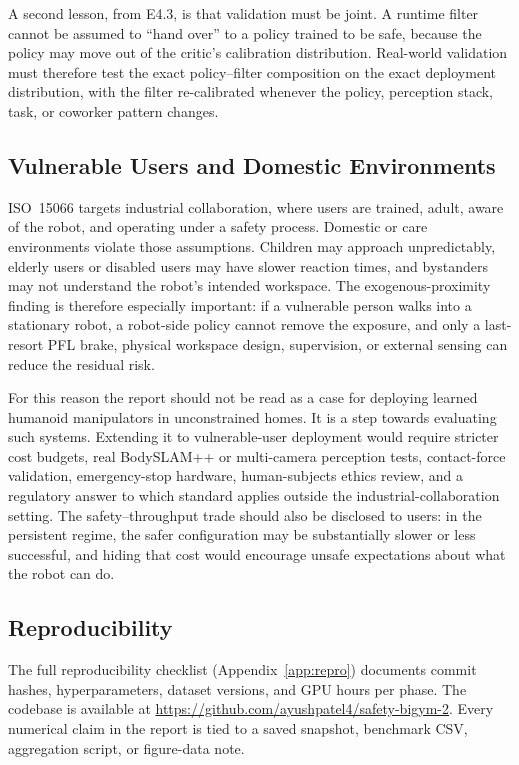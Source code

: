 \documentclass[11pt,a4paper]{report}
\newcommand{\pfl}{PFL}
\newcommand{\iso}{ISO~15066}
\begin{document}
A second lesson, from E4.3, is that validation must be joint. A runtime
filter cannot be assumed to ``hand over'' to a policy trained to be
safe, because the policy may move out of the critic's calibration
distribution. Real-world validation must therefore test the exact
policy--filter composition on the exact deployment distribution, with
the filter re-calibrated whenever the policy, perception stack, task,
or coworker pattern changes.

\subsection{Vulnerable Users and Domestic Environments}

\iso{} targets industrial collaboration, where users are trained,
adult, aware of the robot, and operating under a safety process.
Domestic or care environments violate those assumptions. Children may
approach unpredictably, elderly users or disabled users may have slower
reaction times, and bystanders may not understand the robot's intended
workspace. The exogenous-proximity finding is therefore especially
important: if a vulnerable person walks into a stationary robot, a
robot-side policy cannot remove the exposure, and only a last-resort
\pfl{} brake, physical workspace design, supervision, or external
sensing can reduce the residual risk.

For this reason the report should not be read as a case for deploying
learned humanoid manipulators in unconstrained homes. It is a step
towards evaluating such systems. Extending it to vulnerable-user
deployment would require stricter cost budgets, real BodySLAM++ or
multi-camera perception tests, contact-force validation, emergency-stop
hardware, human-subjects ethics review, and a regulatory answer to
which standard applies outside the industrial-collaboration setting.
The safety--throughput trade should also be disclosed to users: in the
persistent regime, the safer configuration may be substantially slower
or less successful, and hiding that cost would encourage unsafe
expectations about what the robot can do.

\subsection{Reproducibility}

The full reproducibility checklist (Appendix~\ref{app:repro})
documents commit hashes, hyperparameters, dataset versions, and GPU
hours per phase. The codebase is available at
\url{https://github.com/ayushpatel4/safety-bigym-2}. Every numerical
claim in the report is tied to a saved snapshot, benchmark CSV,
aggregation script, or figure-data note.
\end{document}
